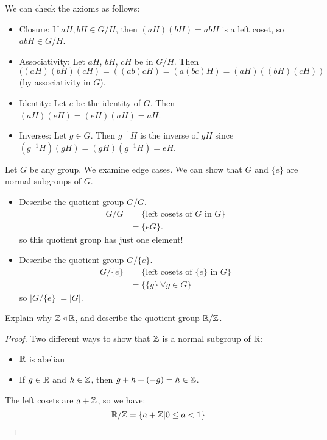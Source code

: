 We can check the axioms as follows:
\begin{itemize}
    \item Closure: If $aH, bH \in G/H$, then $(aH)(bH) = abH$ is a left coset, so $abH \in G/H$.
    \item Associativity: Let $aH$, $bH$, $cH$ be in $G/H$. Then $((aH)(bH)(cH) = ((ab)cH) = (a(bc)H) = (aH)((bH)(cH))$ (by associativity in $G$).
    \item Identity: Let $e$ be the identity of $G$. Then $(aH)(eH) = (eH)(aH) = aH$.
    \item Inverses: Let $g \in G$. Then $g^{-1}H$ is the inverse of $gH$ since $(g^{-1}H)(gH) = (gH)(g^{-1}H) = eH$.
\end{itemize}

\begin{example}
Let $G$ be any group. We examine edge cases. We can show that $G$ and $\{e\}$ are normal subgroups of $G$.

\begin{itemize}
    \item Describe the quotient group $G/G$.
    \begin{align*}
        G/G &= \{\text{left cosets of $G$ in $G$}\} \\
        &= \{eG\}.
    \end{align*}
    so this quotient group has just one element!
    \item Describe the quotient group $G/\{e\}$.
    \begin{align*}
        G/\{e\} &= \{\text{left cosets of $\{e\}$ in $G$}\} \\
        &= \{\{g\} \ \forall g \in G\}
    \end{align*}
    so $|G/\{e\}| = |G|$.
\end{itemize}
\end{example}

\begin{example}
Explain why $\mathbb{Z} \triangleleft \mathbb{R}$, and describe the quotient group $\mathbb{R} / \mathbb{Z}$.
\end{example}

\begin{proof}
Two different ways to show that $\mathbb{Z}$ is a normal subgroup of $\mathbb{R}$:
\begin{itemize}
    \item $\mathbb{R}$ is abelian
    \item If $g \in \mathbb{R}$ and $h \in \mathbb{Z}$, then $g + h + (-g) = h \in \mathbb{Z}$.
\end{itemize}
The left cosets are $a + \mathbb{Z}$, so we have:
\[
\mathbb{R}/\mathbb{Z} = \{a + \mathbb{Z} | 0 \le a < 1\}
\]
\end{proof}

